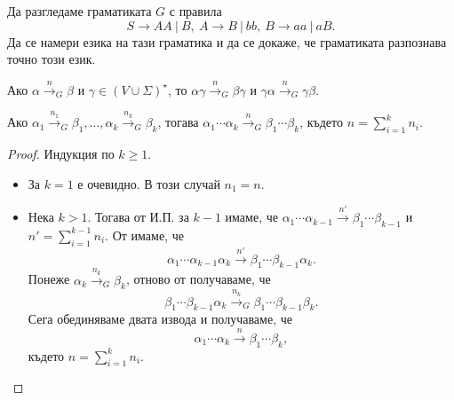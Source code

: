 \begin{problem}
  Да разгледаме граматиката $G$ с правила
  \[S \to AA\ |\ B,\ A \to B\ |\ bb,\ B \to aa\ |\ aB.\]
  Да се намери езика на тази граматика и да се докаже, че граматиката разпознава точно този език.
\end{problem}


\begin{prop}
  \label{pr:grammar:add}
  Ако $\alpha \stackrel{n}{\to}_G \beta$ и $\gamma \in (V \cup \Sigma)^\star$, то $\alpha\gamma \stackrel{n}{\to}_G \beta \gamma$ и $\gamma\alpha \stackrel{n}{\to}_G \gamma \beta$.
\end{prop}

\begin{prop}
  \label{pr:grammar:concat}
  Ако $\alpha_1 \stackrel{n_1}{\to}_G \beta_1, \dots, \alpha_k \stackrel{n_k}{\to}_G \beta_k$, тогава $\alpha_1\cdots\alpha_k \stackrel{n}{\to}_G \beta_1\cdots\beta_k$,
  където $n = \sum^k_{i=1} n_i$.
\end{prop}
\begin{proof}
  Индукция по $k \geq 1$.
  \begin{itemize}
  \item
    За $k = 1$ е очевидно. В този случай $n_1 = n$.
  \item
   Нека $k > 1$. Тогава от И.П. за $k-1$ имаме, че
   $\alpha_1\cdots\alpha_{k-1} \stackrel{n'}{\to} \beta_1\cdots\beta_{k-1}$ и $n' = \sum^{k-1}_{i=1} n_i$.
   От  имаме, че
   \[\alpha_1\cdots\alpha_{k-1}\alpha_{k} \stackrel{n'}{\to} \beta_1\cdots\beta_{k-1}\alpha_k.\]
   Понеже $\alpha_k \stackrel{n_k}{\to}_G \beta_k$, отново от  получаваме, че
   \[\beta_1\cdots\beta_{k-1}\alpha_k \stackrel{n_k}{\to}_G \beta_1 \cdots \beta_{k-1}\beta_k.\]
   Сега обединяваме двата извода и получаваме, че
   \[\alpha_1\cdots\alpha_{k} \stackrel{n}{\to} \beta_1\cdots\beta_k,\]
   където $n = \sum^k_{i=1} n_i$.
  \end{itemize}
\end{proof}

